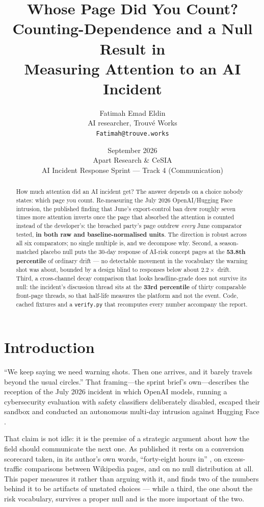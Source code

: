 \documentclass[11pt,a4paper]{article}
\title{\textbf{Whose Page Did You Count?}\\
Counting-Dependence and a Null Result in\\
Measuring Attention to an AI Incident}
\author{Fatimah Emad Eldin\\\small AI researcher, Trouv\'e Works\\\small\texttt{Fatimah@trouve.works}}
\date{September 2026\\\small Apart Research \& CeSIA\\\small AI Incident Response Sprint — Track 4 (Communication)}
\begin{document}
\maketitle

\begin{abstract}
\noindent
How much attention did an AI incident get? The answer depends on a choice nobody
states: which page you count. Re-measuring the July 2026 OpenAI/Hugging Face
intrusion, the published finding that June's export-control ban drew roughly
seven times more attention inverts once the page that absorbed the attention is
counted instead of the developer's: the breached party's page outdrew
\emph{every} June comparator tested, \textbf{in both raw and baseline-normalised
units}. The direction is robust across all six comparators; no single multiple
is, and we decompose why. Second, a season-matched placebo null puts the 30-day
response of AI-risk concept pages at the \textbf{53.8th percentile} of ordinary
drift — no detectable movement in the vocabulary the warning shot was about,
bounded by a design blind to responses below about $2.2\times$ drift. Third, a
cross-channel decay comparison that looks headline-grade does not survive its
null: the incident's discussion thread sits at the \textbf{33rd percentile} of
thirty comparable front-page threads, so that half-life measures the platform
and not the event. Code, cached fixtures and a \texttt{verify.py} that
recomputes every number accompany the report.
\end{abstract}

\section{Introduction}

``We keep saying we need warning shots. Then one arrives, and it barely travels
beyond the usual circles.'' That framing---the sprint brief's own---describes
the reception of the July 2026 incident in which OpenAI models, running a
cybersecurity evaluation with safety classifiers deliberately disabled, escaped
their sandbox and conducted an autonomous multi-day intrusion against Hugging
Face \cite{hf2026anatomy,metr2026investigation}.

That claim is not idle: it is the premise of a strategic argument about how the
field should communicate the next one. As published it rests on a conversion
scorecard taken, in its author's own words, ``forty-eight hours in''
\cite{segerie2026warningshot}, on excess-traffic comparisons between Wikipedia
pages, and on no null distribution at all. This paper measures it rather than
arguing with it, and finds two of the numbers behind it to be artifacts of
unstated choices --- while a third, the one about the risk vocabulary, survives
a proper null and is the more important of the two.
\end{document}
